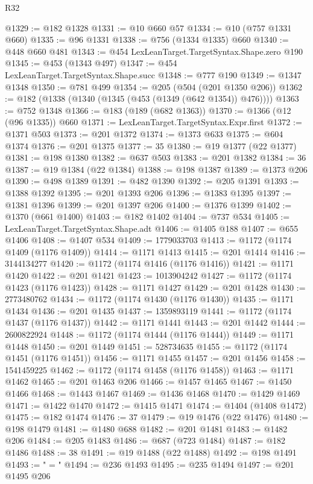 \begin{lexlean}{R32}
\begin{coremodule}
@1329 := @182 @1328
@1331 := @10 @660 @57
@1334 := @10 (@757 @1331 @660)
@1335 := @96 @1331
@1338 := @756 (@1334 @1335) @660
@1340 := @448 @660 @481
@1343 := @454 LexLeanTarget.TargetSyntax.Shape.zero @190
@1345 := @453 (@1343 @497)
@1347 := @454 LexLeanTarget.TargetSyntax.Shape.succ
@1348 := @777 @190
@1349 := @1347 @1348
@1350 := @781 @499
@1354 := @205 (@504 (@201 @1350 @206))
@1362 := @182 (@1338 (@1340 (@1345 (@453 (@1349 (@642 @1354)) @476))))
@1363 := @752 @1348
@1366 := @183 (@189 (@682 @1363))
@1370 := @1366 (@12 (@96 @1335)) @660
@1371 := LexLeanTarget.TargetSyntax.Expr.first
@1372 := @1371 @503
@1373 := @201 @1372
@1374 := @1373 @633
@1375 := @604 @1374
@1376 := @201 @1375
@1377 := 35
@1380 := @19 @1377 (@22 @1377)
@1381 := @198 @1380
@1382 := @637 @503
@1383 := @201 @1382
@1384 := 36
@1387 := @19 @1384 (@22 @1384)
@1388 := @198 @1387
@1389 := @1373 @206
@1390 := @498 @1389
@1391 := @482 @1390
@1392 := @205 @1391
@1393 := @1388 @1392
@1395 := @201 @1393 @206
@1396 := @1383 @1395
@1397 := @1381 @1396
@1399 := @201 @1397 @206
@1400 := @1376 @1399
@1402 := @1370 (@661 @1400)
@1403 := @182 @1402
@1404 := @737 @534
@1405 := LexLeanTarget.TargetSyntax.Shape.adt
@1406 := @1405 @188
@1407 := @655 @1406
@1408 := @1407 @534
@1409 := 1779033703
@1413 := @1172 (@1174 @1409 (@1176 @1409))
@1414 := @1171 @1413
@1415 := @201 @1414
@1416 := 3144134277
@1420 := @1172 (@1174 @1416 (@1176 @1416))
@1421 := @1171 @1420
@1422 := @201 @1421
@1423 := 1013904242
@1427 := @1172 (@1174 @1423 (@1176 @1423))
@1428 := @1171 @1427
@1429 := @201 @1428
@1430 := 2773480762
@1434 := @1172 (@1174 @1430 (@1176 @1430))
@1435 := @1171 @1434
@1436 := @201 @1435
@1437 := 1359893119
@1441 := @1172 (@1174 @1437 (@1176 @1437))
@1442 := @1171 @1441
@1443 := @201 @1442
@1444 := 2600822924
@1448 := @1172 (@1174 @1444 (@1176 @1444))
@1449 := @1171 @1448
@1450 := @201 @1449
@1451 := 528734635
@1455 := @1172 (@1174 @1451 (@1176 @1451))
@1456 := @1171 @1455
@1457 := @201 @1456
@1458 := 1541459225
@1462 := @1172 (@1174 @1458 (@1176 @1458))
@1463 := @1171 @1462
@1465 := @201 @1463 @206
@1466 := @1457 @1465
@1467 := @1450 @1466
@1468 := @1443 @1467
@1469 := @1436 @1468
@1470 := @1429 @1469
@1471 := @1422 @1470
@1472 := @1415 @1471
@1474 := @1404 (@1408 @1472)
@1475 := @182 @1474
@1476 := 37
@1479 := @19 @1476 (@22 @1476)
@1480 := @198 @1479
@1481 := @1480 @688
@1482 := @201 @1481
@1483 := @1482 @206
@1484 := @205 @1483
@1486 := @687 (@723 @1484)
@1487 := @182 @1486
@1488 := 38
@1491 := @19 @1488 (@22 @1488)
@1492 := @198 @1491
@1493 := " = "
@1494 := @236 @1493
@1495 := @235 @1494
@1497 := @201 @1495 @206

\end{coremodule}
\end{lexlean}
